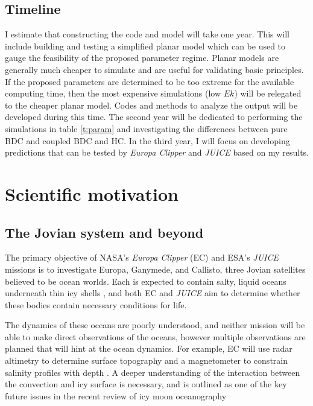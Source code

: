 \documentclass[12pt]{article}
\begin{document}
 \subsection{Timeline}
 I estimate that constructing the code and model will take one year. This will include building and testing a simplified planar model which can be used to gauge the feasibility of the proposed parameter regime. Planar models are generally much cheaper to simulate and are useful for validating basic principles. If the proposed parameters are determined to be too extreme for the available computing time, then the most expensive simulations (low $Ek$) will be relegated to the cheaper planar model. Codes and methods to analyze the output will be developed during this time. The second year will be dedicated to performing the simulations in table \ref{t:param} and investigating the differences between pure BDC and coupled BDC and HC. In the third year, I will focus on developing predictions that can be tested by \textit{Europa Clipper} and \textit{JUICE} based on my results.%

\section{Scientific motivation}
\subsection{The Jovian system and beyond}
The primary objective of NASA's \textit{Europa Clipper} (EC)\cite{pC14_EC} and ESA's \textit{JUICE}\citep{oG13} missions is to investigate Europa, Ganymede, and Callisto, three Jovian satellites believed to be ocean worlds. Each is expected to contain salty, liquid oceans underneath thin icy shells \citep{rP99,fN16}, and both EC and \textit{JUICE} aim to determine whether these bodies contain necessary conditions for life\citep{tB24}. 

The dynamics of these oceans are poorly understood, and neither mission will be able to make direct observations of the oceans, however multiple observations are planned that will hint at the ocean dynamics. For example, EC will use radar altimetry to determine surface topography and a magnetometer to constrain salinity profiles with depth \citep{jR23}.  
A deeper understanding of the interaction between the convection and icy surface is necessary, and is outlined as one of the key future issues in the recent review of icy moon oceanography \citep{kS24}
\end{document}
